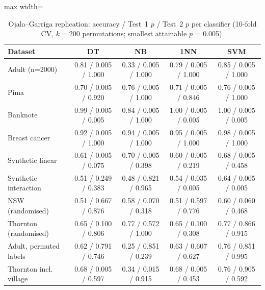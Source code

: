 \begin{table}[!t]
\centering
\caption{Ojala--Garriga replication: accuracy / Test~1 $p$ / Test~2 $p$ per classifier (10-fold CV, $k=200$ permutations; smallest attainable $p$ = 0.005).}
\label{tab:ojala}
\footnotesize
\begin{adjustbox}{max width=\linewidth}
\begin{tabular}{lcccc}
\hline
Dataset & DT & NB & 1NN & SVM \\ \hline
Adult (n=2000) & 0.81 / 0.005 / 1.000 & 0.33 / 0.005 / 1.000 & 0.79 / 0.005 / 1.000 & 0.85 / 0.005 / 1.000 \\
Pima & 0.70 / 0.005 / 0.920 & 0.76 / 0.005 / 1.000 & 0.71 / 0.005 / 0.846 & 0.76 / 0.005 / 1.000 \\
Banknote & 0.99 / 0.005 / 0.005 & 0.84 / 0.005 / 1.000 & 1.00 / 0.005 / 0.005 & 1.00 / 0.005 / 0.005 \\
Breast cancer & 0.92 / 0.005 / 1.000 & 0.94 / 0.005 / 1.000 & 0.95 / 0.005 / 1.000 & 0.98 / 0.005 / 1.000 \\
Synthetic linear & 0.61 / 0.005 / 0.075 & 0.70 / 0.005 / 0.398 & 0.60 / 0.005 / 0.219 & 0.68 / 0.005 / 0.458 \\
Synthetic interaction & 0.51 / 0.249 / 0.383 & 0.48 / 0.821 / 0.965 & 0.54 / 0.035 / 0.005 & 0.64 / 0.005 / 0.005 \\
NSW (randomised) & 0.51 / 0.667 / 0.876 & 0.58 / 0.070 / 0.318 & 0.51 / 0.597 / 0.776 & 0.60 / 0.060 / 0.468 \\
Thornton (randomised) & 0.65 / 0.100 / 0.806 & 0.77 / 0.572 / 1.000 & 0.65 / 0.100 / 0.308 & 0.77 / 0.866 / 0.915 \\
Adult, permuted labels & 0.62 / 0.791 / 0.746 & 0.25 / 0.851 / 0.239 & 0.63 / 0.607 / 0.627 & 0.76 / 0.851 / 0.995 \\
Thornton incl. village & 0.68 / 0.005 / 0.597 & 0.34 / 0.015 / 0.915 & 0.68 / 0.005 / 0.453 & 0.76 / 0.905 / 0.592 \\
\hline
\end{tabular}
\end{adjustbox}
\end{table}
